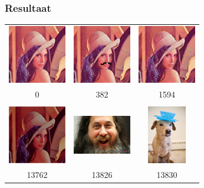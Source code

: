 \documentclass{beamer}
\begin{document}
\begin{frame}
  \frametitle{Resultaat}

  \centering

  \begin{tabular}{ccc}
    \includegraphics[height=1in,width=1in,keepaspectratio]{../images/60.png} &
    \includegraphics[height=1in,width=1in,keepaspectratio]{../images/64.jpg} &
    \includegraphics[height=1in,width=1in,keepaspectratio]{../images/61.jpg} \\
    0 & 382 & 1594 \\&&\\
    \includegraphics[height=1in,width=1in,keepaspectratio]{../images/63.jpg} &
    \includegraphics[height=1in,width=1in,keepaspectratio]{../images/57.jpg} &
    \includegraphics[height=1in,width=1in,keepaspectratio]{../images/12.jpg} \\
    13762 & 13826 & 13830
  \end{tabular}

\end{frame}
\end{document}
